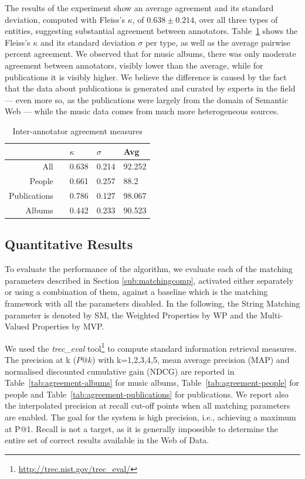 The results of the experiment show an average agreement and its standard deviation, computed with Fleiss's $\kappa$, of $0.638\pm0.214$, over all three types of entities, suggesting substantial agreement between annotators. Table~\ref{tab:agreementsdwod} shows the Fleiss's $\kappa$ and its standard deviation $\sigma$ per type, as well as the average pairwise percent agreement. We observed that for music albums, there was only moderate agreement between annotators, visibly lower than the average, while for publications it is visibly higher. We believe the difference is caused by the fact that the data about publications is generated and curated by experts in the field --- even more so, as the publications were largely from the domain of Semantic Web --- while the music data comes from much more heterogeneous sources.

\begin{table}
\centering
{}
\begin{tabular}{@{}rcl@{\hs}l@{\hs}l@{}}
\toprule
& \phantom{a} & $\kappa$ & $\sigma$ & Avg  \\ 
\midrule

 All && 0.638 & 0.214 & 92.252 \\

 People && 0.661 & 0.257 & 88.2 \\

 Publications && 0.786 & 0.127 & 98.067  \\

 Albums && 0.442 & 0.233 & 90.523 \\

\bottomrule
\end{tabular}
\caption{Inter-annotator agreement measures}
\label{tab:agreementsdwod}
\end{table}

\subsection{Quantitative Results}

To evaluate the performance of the algorithm, we evaluate each of the matching parameters described in Section \ref{sub:matchingcomp}, activated either separately or using a combination of them, against a baseline which is the matching framework with all the parameters disabled. In the following, the String Matching parameter is denoted by SM, the Weighted Properties by WP and the Multi-Valued Properties by MVP.

We used the \emph{trec\_eval} tool\footnote{\url{http://trec.nist.gov/trec_eval/}} to compute standard information retrieval measures.
The precision at k ($P@k$) with k={1,2,3,4,5}, mean average precision (MAP) and normalised discounted cumulative gain (NDCG) are reported in Table~\ref{tab:agreement-albums} for music albums, Table~\ref{tab:agreement-people} for people and Table~\ref{tab:agreement-publications} for publications. 
We report also the interpolated precision at recall cut-off points when all matching parameters are enabled. The goal for the system is high precision, i.e., achieving a maximum at P@1. Recall is not a target, as it is generally impossible to determine the entire set of correct results available in the Web of Data.

